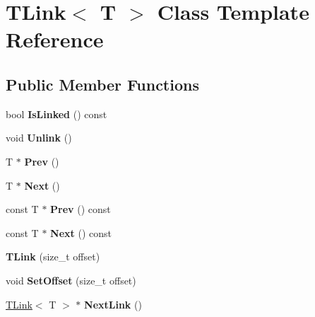 \hypertarget{class_t_link}{\section{T\-Link$<$ T $>$ Class Template Reference}
\label{class_t_link}
}
\subsection*{Public Member Functions}
\begin{DoxyCompactItemize}
\item 
\hypertarget{class_t_link_aa01e1ccd6b7846016012a5343224c1b5}{bool {\bfseries Is\-Linked} () const }\label{class_t_link_aa01e1ccd6b7846016012a5343224c1b5}

\item 
\hypertarget{class_t_link_a14724694f16ea9d88062e3f14d139f14}{void {\bfseries Unlink} ()}\label{class_t_link_a14724694f16ea9d88062e3f14d139f14}

\item 
\hypertarget{class_t_link_a52dd2245c7c585d9bed1f30d12698cb7}{T $\ast$ {\bfseries Prev} ()}\label{class_t_link_a52dd2245c7c585d9bed1f30d12698cb7}

\item 
\hypertarget{class_t_link_ac554775ff4a03d9910df8a02d64679d9}{T $\ast$ {\bfseries Next} ()}\label{class_t_link_ac554775ff4a03d9910df8a02d64679d9}

\item 
\hypertarget{class_t_link_a66d75afd6f0c37ad08bc670f6ca4aa58}{const T $\ast$ {\bfseries Prev} () const }\label{class_t_link_a66d75afd6f0c37ad08bc670f6ca4aa58}

\item 
\hypertarget{class_t_link_a9b4cc1c1ae47207eda1513bd0a0209b5}{const T $\ast$ {\bfseries Next} () const }\label{class_t_link_a9b4cc1c1ae47207eda1513bd0a0209b5}

\item 
\hypertarget{class_t_link_ac110b19a42fdb07d693821a26ba23e73}{{\bfseries T\-Link} (size\-\_\-t offset)}\label{class_t_link_ac110b19a42fdb07d693821a26ba23e73}

\item 
\hypertarget{class_t_link_a67cf76748fc80be33887a3d4bf1cb7cb}{void {\bfseries Set\-Offset} (size\-\_\-t offset)}\label{class_t_link_a67cf76748fc80be33887a3d4bf1cb7cb}

\item 
\hypertarget{class_t_link_a5e58431627debb2040c18c04f3642694}{\hyperlink{class_t_link}{T\-Link}$<$ T $>$ $\ast$ {\bfseries Next\-Link} ()}\label{class_t_link_a5e58431627debb2040c18c04f3642694}


\end{DoxyCompactItemize}

